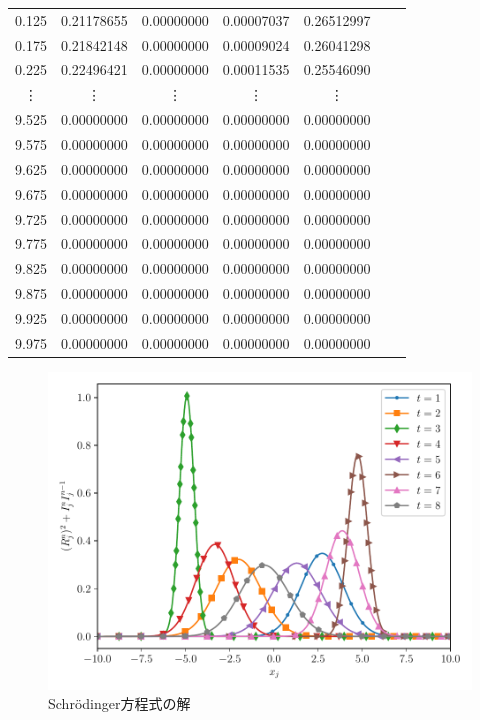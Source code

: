 \documentclass[a4j, titlepage]{jsarticle}
\numberwithin{equation}{section}
\begin{document}
\begin{table}[h]
\begin{tabular}{ccccccc}
                    0.125 & 0.21178655 & 0.00000000 & 0.00007037 & 0.26512997 \\
                    0.175 & 0.21842148 & 0.00000000 & 0.00009024 & 0.26041298 \\
                    0.225 & 0.22496421 & 0.00000000 & 0.00011535 & 0.25546090 \\
                    \vdots & \vdots & \vdots & \vdots & \vdots \vspace{1mm} \\
                    9.525 & 0.00000000 & 0.00000000 & 0.00000000 & 0.00000000 \\
                    9.575 & 0.00000000 & 0.00000000 & 0.00000000 & 0.00000000 \\
                    9.625 & 0.00000000 & 0.00000000 & 0.00000000 & 0.00000000 \\
                    9.675 & 0.00000000 & 0.00000000 & 0.00000000 & 0.00000000 \\
                    9.725 & 0.00000000 & 0.00000000 & 0.00000000 & 0.00000000 \\
                    9.775 & 0.00000000 & 0.00000000 & 0.00000000 & 0.00000000 \\
                    9.825 & 0.00000000 & 0.00000000 & 0.00000000 & 0.00000000 \\
                    9.875 & 0.00000000 & 0.00000000 & 0.00000000 & 0.00000000 \\
                    9.925 & 0.00000000 & 0.00000000 & 0.00000000 & 0.00000000 \\
                    9.975 & 0.00000000 & 0.00000000 & 0.00000000 & 0.00000000 \\
                    \hline
                \end{tabular}
            \end{table}
            \begin{figure}[h]
                \centering
                \includegraphics[width=0.8\hsize]{kadai3/main.pdf}
                \caption{Schr\"{o}dinger方程式の解}
                \label{fig:schroedinger}
            \end{figure}

\newpage
{}
\begin{thebibliography}{99}
\end{thebibliography}
\end{document}

